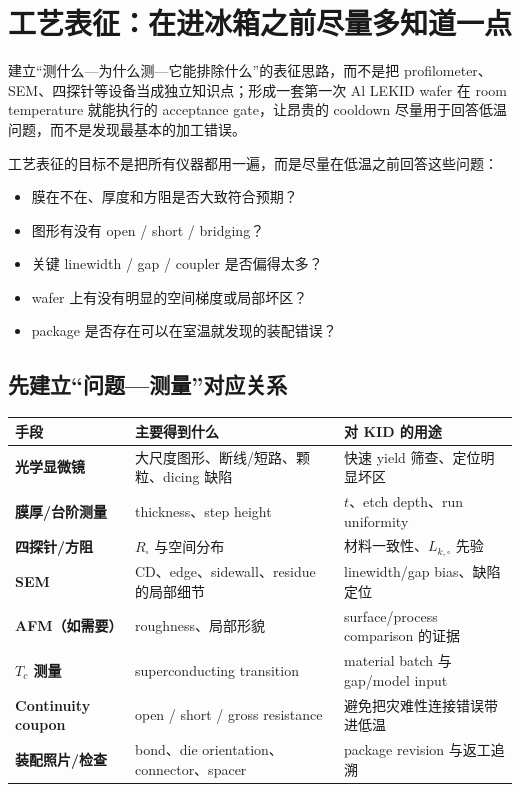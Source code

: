 \chapter{工艺表征：在进冰箱之前尽量多知道一点}

\begin{chaptergoal}
建立“测什么—为什么测—它能排除什么”的表征思路，而不是把 profilometer、SEM、四探针等设备当成独立知识点；形成一套第一次 Al LEKID wafer 在 room temperature 就能执行的 acceptance gate，让昂贵的 cooldown 尽量用于回答低温问题，而不是发现最基本的加工错误。
\end{chaptergoal}

工艺表征的目标不是把所有仪器都用一遍，而是尽量在低温之前回答这些问题：

\begin{itemize}
  \item 膜在不在、厚度和方阻是否大致符合预期？
  \item 图形有没有 open / short / bridging？
  \item 关键 linewidth / gap / coupler 是否偏得太多？
  \item wafer 上有没有明显的空间梯度或局部坏区？
  \item package 是否存在可以在室温就发现的装配错误？
\end{itemize}


\section{先建立“问题—测量”对应关系}

\begin{center}
\begin{tabularx}{0.97\textwidth}{>{\bfseries}p{3.0cm} X X}
\toprule
手段 & 主要得到什么 & 对 KID 的用途 \\
\midrule
光学显微镜 & 大尺度图形、断线/短路、颗粒、dicing 缺陷 & 快速 yield 筛查、定位明显坏区 \\
膜厚/台阶测量 & thickness、step height & $t$、etch depth、run uniformity \\
四探针/方阻 & $R_\square$ 与空间分布 & 材料一致性、$L_{k,\square}$ 先验 \\
SEM & CD、edge、sidewall、residue 的局部细节 & linewidth/gap bias、缺陷定位 \\
AFM（如需要） & roughness、局部形貌 & surface/process comparison 的证据 \\
$T_c$ 测量 & superconducting transition & material batch 与 gap/model input \\
Continuity coupon & open / short / gross resistance & 避免把灾难性连接错误带进低温 \\
装配照片/检查 & bond、die orientation、connector、spacer & package revision 与返工追溯 \\
\bottomrule
\end{tabularx}
\end{center}


